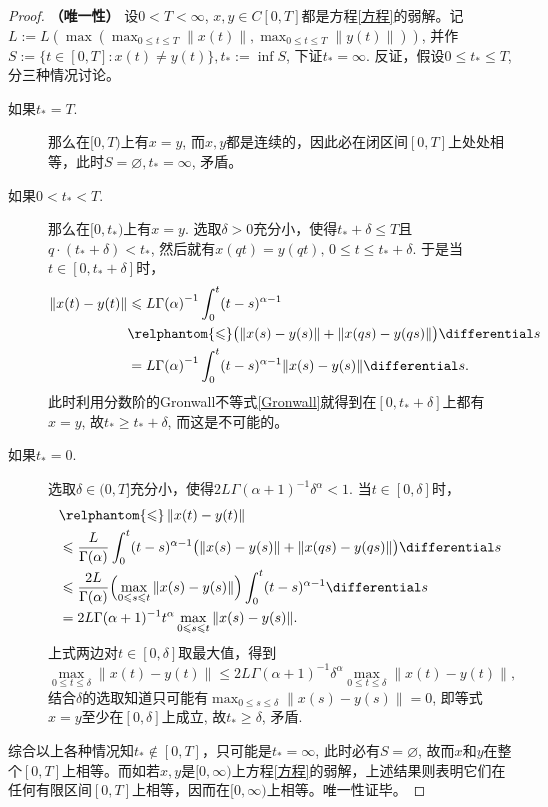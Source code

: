 \begin{proof}
    \textbf{（唯一性）} 设$0<T<\infty$, $x,y\in C[0,T]$都是方程\eqref{方程}的弱解。记$L:=L\left(\max\left(\max_{0\leqslant t\leqslant T}\|x(t)\|,\right.\right.\allowbreak\left.\left.\max_{0\leqslant t\leqslant T}\|y(t)\|\right)\right)$, 并作$S:=\{t\in [0,T]\colon x(t)\neq y(t)\},t_*:=\inf S$, 下证$t_*=\infty$. 反证，假设$0\leqslant t_*\leqslant T$, 分三种情况讨论。
    \begin{description}
        \item[如果$t_*=T$.] 那么在$[0,T)$上有$x=y$, 而$x,y$都是连续的，因此必在闭区间$[0,T]$上处处相等，此时$S=\varnothing,t_*=\infty$, 矛盾。
        \item[如果$0<t_*<T$.] 那么在$[0,t_*)$上有$x=y$. 选取$\delta>0$充分小，使得$t_*+\delta\leqslant T$且$q\cdot (t_*+\delta)<t_*$, 然后就有$x(qt)=y(qt),\,0\leqslant t\leqslant t_*+\delta$. 于是当$t\in \left[0,t_*+\delta\right]$时，
        \begin{align*}
            \left\| x(t) - y(t) \right\| & \leqslant {L}{\Gamma(\alpha)}^{-1} \int_0^t (t-s)^{\alpha-1} \\ &\relphantom{\leqslant} \bigl(\|x(s)-y(s)\|+\|x(qs)-y(qs)\|\bigr) \differential s\\
            &={L}{\Gamma(\alpha)}^{-1} \int_0^t (t-s)^{\alpha-1} \|x(s)-y(s)\| \differential s.
        \end{align*}
        此时利用分数阶的Gronwall不等式\cref{Gronwall}就得到在$\left[0,t_*+\delta\right]$上都有$x=y$, 故$t_*\geqslant t_*+\delta$, 而这是不可能的。
        \item[如果$t_*=0$.] 选取$\delta\in (0,T]$充分小，使得$2L\Gamma(\alpha+1)^{-1}\delta^\alpha<1$. 当$t\in[0,\delta]$时，
        \begin{align*}
            &\relphantom{\leqslant}\left\| x(t) - y(t) \right\| \\& \leqslant \frac{L}{\Gamma(\alpha)} \int_0^t (t-s)^{\alpha-1} \bigl(\|x(s)-y(s)\|+\|x(qs)-y(qs)\|\bigr) \differential s\\
            &\leqslant \frac{2L}{\Gamma(\alpha)} \Bigl(\max_{0\leqslant s\leqslant t}\|x(s)-y(s)\|\Bigr) \int_0^t (t-s)^{\alpha-1} \differential s\\
            &=2L\Gamma(\alpha+1)^{-1}t^\alpha \max_{0\leqslant s\leqslant t}\|x(s)-y(s)\|.
        \end{align*}
        上式两边对$t\in[0,\delta]$取最大值，得到
        \begin{equation*}
            \max_{0\leqslant t\leqslant \delta}\|x(t)-y(t)\|\leqslant 2L\Gamma(\alpha+1)^{-1}\delta^\alpha \max_{0\leqslant t\leqslant \delta}\|x(t)-y(t)\|,
        \end{equation*}
        结合$\delta$的选取知道只可能有$\max_{0\leqslant s\leqslant \delta}\|x(s)-y(s)\|=0$, 即等式$x=y$至少在$[0,\delta]$上成立, 故$t_*\geqslant \delta$, 矛盾.
    \end{description}
    综合以上各种情况知$t_*\notin [0,T]$，只可能是$t_*=\infty$, 此时必有$S=\varnothing$, 故而$x$和$y$在整个$[0,T]$上相等。而如若$x,y$是$[0,\infty)$上方程\eqref{方程}的弱解，上述结果则表明它们在任何有限区间$[0,T]$上相等，因而在$[0,\infty)$上相等。唯一性证毕。
\end{proof}

